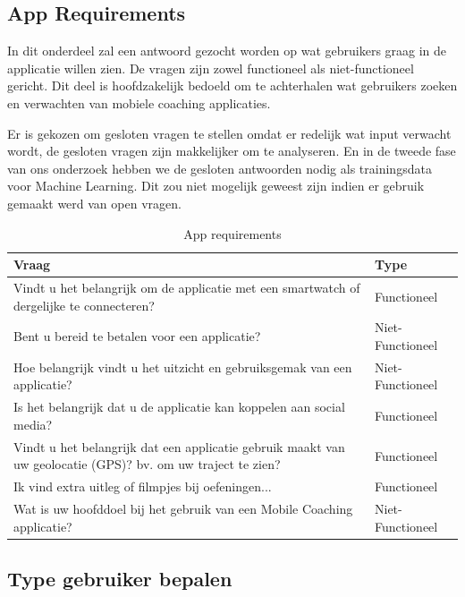 \subsection{App Requirements}

In dit onderdeel zal een antwoord gezocht worden op wat gebruikers graag in de applicatie willen zien. De vragen zijn zowel functioneel als niet-functioneel gericht. Dit deel is hoofdzakelijk bedoeld om te achterhalen wat gebruikers zoeken en verwachten van mobiele coaching applicaties. 

Er is gekozen om gesloten vragen te stellen omdat er redelijk wat input verwacht wordt, de gesloten vragen zijn makkelijker om te analyseren. En in de tweede fase van ons onderzoek hebben we de gesloten antwoorden nodig als trainingsdata voor Machine Learning. Dit zou niet mogelijk geweest zijn indien er gebruik gemaakt werd van open vragen.

\begin{table}[h!]
\begin{center}
\begin{tabular}{ |p{11cm}|p{3cm}| }
 \hline
 \textbf{Vraag}   &  \textbf{Type} \\
 \hline
Vindt u het belangrijk om de applicatie met een smartwatch of dergelijke te connecteren? &   Functioneel   \\
 \hline
 Bent u bereid te betalen voor een applicatie? &  Niet-Functioneel   \\
 \hline
 Hoe belangrijk vindt u het uitzicht en gebruiksgemak van een applicatie? &  Niet-Functioneel  \\
 \hline
   Is het belangrijk dat u de applicatie kan koppelen aan social media? & Functioneel \\
 \hline
    Vindt u het belangrijk dat een applicatie gebruik maakt van uw geolocatie (GPS)? bv. om uw traject te zien? & Functioneel \\
 \hline
    Ik vind extra uitleg of filmpjes bij oefeningen... & Functioneel \\
 \hline
  Wat is uw hoofddoel bij het gebruik van een Mobile Coaching applicatie? & Niet-Functioneel \\
 \hline
\end{tabular}
\end{center}
\caption{App requirements}
\label{table:1}
\end{table}

\subsection{Type gebruiker bepalen}

